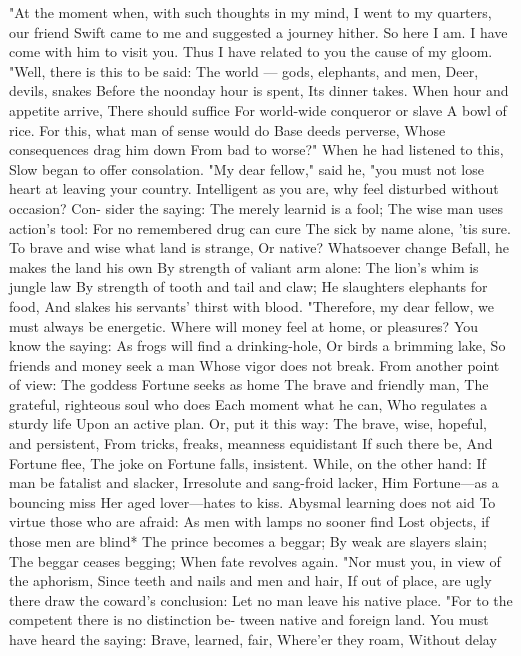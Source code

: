 \documentclass{book}
\begin{document}
"At the moment when, with such thoughts in my
mind, I went to my quarters, our friend Swift came
to me and suggested a journey hither. So here I am.
I have come with him to visit you. Thus I have
related to you the cause of my gloom.
"Well, there is this to be said:
The world --- gods, elephants, and men,
Deer, devils, snakes
Before the noonday hour is spent,
Its dinner takes.
When hour and appetite arrive,
There should suffice
For world-wide conqueror or slave
A bowl of rice.
For this, what man of sense would do
Base deeds perverse,
Whose consequences drag him down
From bad to worse?"
When he had listened to this, Slow began to offer
consolation. "My dear fellow," said he, "you must
not lose heart at leaving your country. Intelligent as
you are, why feel disturbed without occasion? Con-
sider the saying:
The merely learnid is a fool;
The wise man uses action's tool:
For no remembered drug can cure
The sick by name alone, 'tis sure.
To brave and wise what land is strange,
Or native? Whatsoever change
Befall, he makes the land his own
By strength of valiant arm alone:
The lion's whim is jungle law
By strength of tooth and tail and claw;
He slaughters elephants for food,
And slakes his servants' thirst with blood.
"Therefore, my dear fellow, we must always be
energetic. Where will money feel at home, or
pleasures? You know the saying:
As frogs will find a drinking-hole,
Or birds a brimming lake,
So friends and money seek a man
Whose vigor does not break.
From another point of view:
The goddess Fortune seeks as home
The brave and friendly man,
The grateful, righteous soul who does
Each moment what he can,
Who regulates a sturdy life
Upon an active plan.
Or, put it this way:
The brave, wise, hopeful, and persistent,
From tricks, freaks, meanness equidistant
If such there be,
And Fortune flee,
The joke on Fortune falls, insistent.
While, on the other hand:
If man be fatalist and slacker,
Irresolute and sang-froid lacker,
Him Fortune---as a bouncing miss
Her aged lover---hates to kiss.
Abysmal learning does not aid
To virtue those who are afraid:
As men with lamps no sooner find
Lost objects, if those men are blind*
The prince becomes a beggar;
By weak are slayers slain;
The beggar ceases begging;
When fate revolves again.
"Nor must you, in view of the aphorism,
Since teeth and nails and men and hair,
If out of place, are ugly there
draw the coward's conclusion:
Let no man leave his native place.
"For to the competent there is no distinction be-
tween native and foreign land. You must have heard
the saying:
Brave, learned, fair,
Where'er they roam,
Without delay
\end{document}
